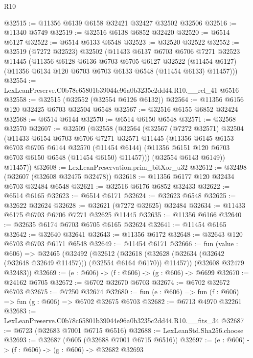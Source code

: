 \begin{lexlean}{R10}
\begin{coremodule}
@32515 := @11356 @6139 @6158 @32421 @32427 @32502 @32506
@32516 := @11340 @5749
@32519 := @32516 @6138 @6852 @32420
@32520 := @6514 @6127
@32522 := @6514 @6133 @6548
@32523 := @32520 @32522
@32552 := @32519
    (@7272 @32523)
    @32502
    (@11433
      @6137
      @6703
      @6706
      @7271
      @32523
      @11445
      (@11356
        @6128
        @6136
        @6703
        @6705
        @6127
        @32522
        (@11454 @6127)
        (@11356 @6134 @120 @6703 @6703 @6133 @6548 (@11454 @6133) @11457)))
@32554 := LexLeanPreserve.C0b78c65801b39044e96a0b3235c2dd44.R10.__rel_41 @6516
@32558 := @32515 (@32552 (@32554 @6126 @6132))
@32564 := @11356 @6156 @120 @32425 @6703 @32504 @6548
@32567 := @32516 @6155 @6852 @32424
@32568 := @6514 @6144
@32570 := @6514 @6150 @6548
@32571 := @32568 @32570
@32607 := @32509
    (@32558
      (@32564
        (@32567
          (@7272 @32571)
          @32504
          (@11433
            @6154
            @6703
            @6706
            @7271
            @32571
            @11445
            (@11356
              @6145
              @6153
              @6703
              @6705
              @6144
              @32570
              (@11454 @6144)
              (@11356 @6151 @120 @6703 @6703 @6150 @6548 (@11454 @6150) @11457)))
          (@32554 @6143 @6149))
        @11457))
@32608 := LexLeanPreservation.prim_bitXor_u32
@32612 := @32498 (@32607 (@32608 @32475 @32478))
@32618 := @11356 @6177 @120 @32434 @6703 @32484 @6548
@32621 := @32516 @6176 @6852 @32433
@32622 := @6514 @6165
@32623 := @6514 @6171
@32624 := @32623 @6548
@32625 := @32622 @32624
@32628 := @32621 (@7272 @32625) @32484
@32634 := @11433 @6175 @6703 @6706 @7271 @32625 @11445
@32635 := @11356 @6166
@32640 := @32635 @6174 @6703 @6705 @6165 @32624
@32641 := @11454 @6165
@32642 := @32640 @32641
@32643 := @11356 @6172
@32648 := @32643 @120 @6703 @6703 @6171 @6548
@32649 := @11454 @6171
@32666 := fun (value : @606) =>
  @32465
    (@32492
      (@32612
        (@32618 (@32628 (@32634 (@32642 (@32648 @32649 @11457))) (@32554 @6164 @6170)) @11457))
      (@32608 @32479 @32483))
@32669 := (e : @606) -> (f : @606) -> (g : @606) -> @6699
@32670 := @24162 @6705
@32672 := @6702 @32670 @6703
@32674 := @6702 @32672 @6703
@32675 := @7250 @32674
@32680 := fun (e : @606) => fun (f : @606) => fun (g : @606) => @6702 @32675 @6703
@32682 := @6713 @4970 @32261
@32683 := LexLeanPreserve.C0b78c65801b39044e96a0b3235c2dd44.R10.__fits_34
@32687 := @6723 (@32683 @7001 @6715 @6516)
@32688 := LexLeanStd.Sha256.choose
@32693 := @32687 (@605 (@32688 @7001 @6715 @6516))
@32697 := (e : @606) -> (f : @606) -> (g : @606) -> @32682 @32693

\end{coremodule}
\end{lexlean}
